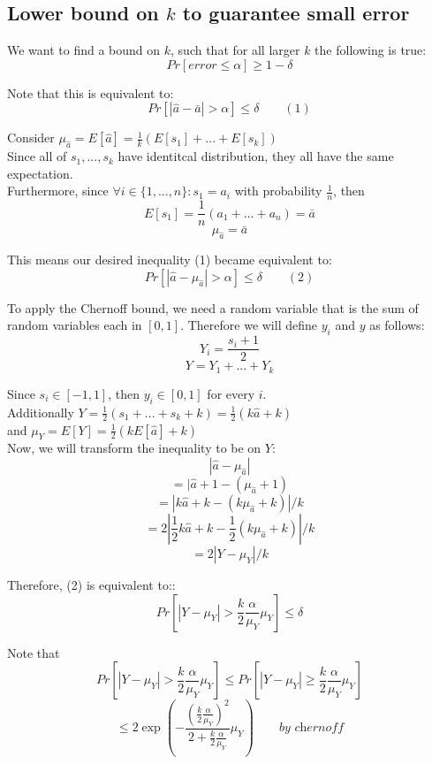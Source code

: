 \subsection{Lower bound on $k$ to guarantee small error}
We want to find a bound on $k$, such that for all larger $k$ the following is true:
$$ Pr[ error \leq \alpha ] \geq 1 - \delta $$

\noindent Note that this is equivalent to:
$$ Pr[ | \hat{a} - \bar{a}| > \alpha ] \leq \delta \quad \quad (1)$$

\noindent Consider $\mu_{\hat{a}} = E[ \hat{a} ] = \frac{1}{k}(E[s_1] + ... + E[s_k])$ \\
Since all of $s_1, ..., s_k$ have identitcal distribution, they all have the same expectation. \\
Furthermore, since $\forall i \in \{1, ..., n\}: s_1 = a_i$ with probability $\frac{1}{n}$, then
$$ E[s_1] =  \frac{1}{n}(a_1 + ... + a_n) = \bar{a}$$
$$ \mu_{\hat{a}} = \bar{a} $$

\noindent This means our desired inequality (1) became equivalent to:
$$ Pr[ | \hat{a} - \mu_{\hat{a}}| > \alpha ] \leq \delta \quad \quad (2) $$

\noindent To apply the Chernoff bound, we need a random variable that is the sum of random variables each in $[0,1]$. Therefore we will define $y_i$ and $y$ as follows:
$$Y_i = \frac{s_i + 1}{2}$$
$$Y = Y_1 + ... + Y_k$$

\noindent Since $s_i \in [-1, 1]$, then $y_i \in [0, 1]$ for every $i$. \\

\noindent Additionally $Y = \frac{1}{2}(s_1 + ... + s_k + k) = \frac{1}{2}(k\hat{a} + k)$\\
\noindent and $\mu_Y = E[Y] = \frac{1}{2}(kE[\hat{a}] + k)$ \\

\noindent Now, we will transform the inequality to be on $Y$:
$$ | \hat{a} - \mu_{\hat{a}} | $$
$$ = | \hat{a} + 1 - (\mu_{\hat{a}} + 1) $$
$$ = | k\hat{a} + k - (k\mu_{\hat{a}} + k) | / k $$
$$ = 2 | \frac{1}{2}k\hat{a} + k - \frac{1}{2}(k\mu_{\hat{a}} + k) | / k $$
$$ = 2 | Y - \mu_Y| / k $$

Therefore, (2) is equivalent to::
$$ Pr[ | Y - \mu_Y| > \frac{k}{2} \frac{\alpha}{\mu_Y}\mu_Y ] \leq \delta$$

Note that
$$ Pr[ | Y - \mu_Y| > \frac{k}{2} \frac{\alpha}{\mu_Y}\mu_Y ] \leq Pr[ | Y - \mu_Y| \geq \frac{k}{2} \frac{\alpha}{\mu_Y}\mu_Y ] $$
$$ \leq 2 \exp(- \frac{(\frac{k}{2} \frac{\alpha}{\mu_Y})^2}{2 + \frac{k}{2} \frac{\alpha}{\mu_Y}}\mu_Y) \quad \quad\textit{by chernoff}$$


